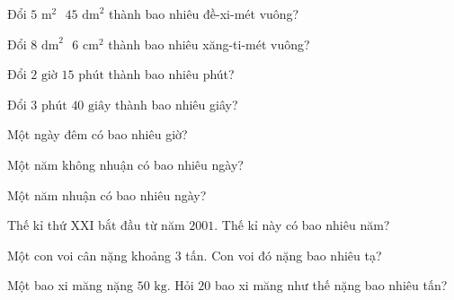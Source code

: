 \begin{ex}
  Đổi $5\text{ m}^2\text{ } 45\text{ dm}^2$ thành bao nhiêu đề-xi-mét vuông?
\end{ex}

\begin{ex}
  Đổi $8\text{ dm}^2\text{ } 6\text{ cm}^2$ thành bao nhiêu xăng-ti-mét vuông?
\end{ex}

\begin{ex}
  Đổi $2\text{ giờ } 15\text{ phút}$ thành bao nhiêu phút?
\end{ex}

\begin{ex}
  Đổi $3\text{ phút } 40\text{ giây}$ thành bao nhiêu giây?
\end{ex}

\begin{ex}
  Một ngày đêm có bao nhiêu giờ?
\end{ex}

\begin{ex}
  Một năm không nhuận có bao nhiêu ngày?
\end{ex}

\begin{ex}
  Một năm nhuận có bao nhiêu ngày?
\end{ex}

\begin{ex}
  Thế kỉ thứ XXI bắt đầu từ năm $2001$. Thế kỉ này có bao nhiêu năm?
\end{ex}

\begin{ex}
  Một con voi cân nặng khoảng $3$ tấn. Con voi đó nặng bao nhiêu tạ?
\end{ex}

\begin{ex}
  Một bao xi măng nặng $50\text{ kg}$. Hỏi $20$ bao xi măng như thế nặng bao nhiêu tấn?
\end{ex}

